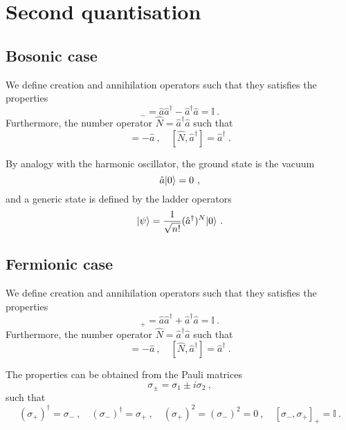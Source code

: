 \chapter{Second quantisation} 

\section{Bosonic case}

    We define creation and annihilation operators such that they satisfies the properties 
    \begin{equation*}
        [\hat a, \hat a^\dagger]_- = \hat a \hat a^\dagger - \hat a^\dagger \hat a = \mathbb I~.
    \end{equation*}
    Furthermore, the number operator $\hat N = \hat a^\dagger \hat a$ such that 
    \begin{equation*}
        [\hat N, \hat a] = - \hat a~, \quad [\hat N, \hat a^\dagger] = \hat a^\dagger ~.
    \end{equation*} 

    By analogy with the harmonic oscillator, the ground state is the vacuum 
    \begin{equation*}
        \hat a \vert0\rangle = 0 ~,
    \end{equation*}
    and a generic state is defined by the ladder operators
    \begin{equation*}
        \vert\psi\rangle = \frac{1}{\sqrt{n!}} (\hat a^\dagger)^N \vert0\rangle ~.
    \end{equation*}

\section{Fermionic case}

    We define creation and annihilation operators such that they satisfies the properties 
    \begin{equation*}
        [\hat a, \hat a^\dagger]_+ = \hat a \hat a^\dagger + \hat a^\dagger \hat a = \mathbb I~.
    \end{equation*}
    Furthermore, the number operator $\hat N = \hat a^\dagger \hat a$ such that 
    \begin{equation*}
        [\hat N, \hat a] = - \hat a~, \quad [\hat N, \hat a^\dagger] = \hat a^\dagger ~.
    \end{equation*} 

    The properties can be obtained from the Pauli matrices 
    \begin{equation*}
        \sigma_\pm = \sigma_1 \pm i \sigma_2 ~,
    \end{equation*}
    such that 
    \begin{equation*}
        (\sigma_+)^\dagger = \sigma_- ~, \quad (\sigma_-)^\dagger = \sigma_+ ~, \quad (\sigma_+)^2 = (\sigma_-)^2 = 0 ~, \quad [\sigma_-, \sigma_+]_+ = \mathbb I ~.
    \end{equation*}

